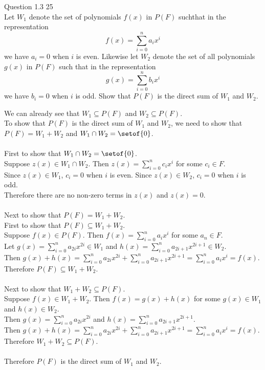 \documentclass[answers,12pt,addpoints]{exam}
\begin{document}
\begin{questions}
    \question Question 1.3 25\\
    Let $W_1$ denote the set of polynomials $f(x)$ in $P(F)$ suchthat in the representation 
    $$ f(x) = \sum_{i=0}^n a_i x^i$$
    we have $a_i = 0$ when $i$ is even. Likewise let $W_2$ denote the set of all polynomials $g(x)$ in $P(F)$ such that in the representation
    $$ g(x) = \sum_{i=0}^n b_i x^i$$
    we have $b_i = 0$ when $i$ is odd. Show that $P(F)$ is the direct sum of $W_1$ and $W_2$.
    \begin{solution}
        We can already see that $W_1 \subseteq P(F)$ and $W_2 \subseteq P(F)$.\\
        To show that $P(F)$ is the direct sum of $W_1$ and $W_2$, we need to show that $P(F) = W_1 + W_2$ and $W_1 \cap W_2 = \setof{0}$.\\\\
        First to show that $W_1 \cap W_2 = \setof{0}$.\\
        Suppose $z(x) \in W_1 \cap W_2$. Then $z(x) = \sum_{i=0}^n c_i x^i$ for some $c_i \in F$.\\
        Since $z(x) \in W_1$, $c_i = 0$ when $i$ is even. Since $z(x) \in W_2$, $c_i = 0$ when $i$ is odd.\\
        Therefore there are no non-zero terms in $z(x)$ and $z(x) = 0$.\\\\
        Next to show that $P(F) = W_1 + W_2$.\\
        First to show that $P(F) \subseteq W_1 + W_2$.\\
        Suppose $f(x) \in P(F)$. Then $f(x) = \sum_{i=0}^n a_i x^i$ for some $a_n \in F$.\\
        Let $g(x) = \sum_{i=0}^n a_{2i} x^{2i} \in W_1$ and $h(x) = \sum_{i=0}^n a_{2i+1} x^{2i+1} \in W_2$.\\
        Then $g(x) + h(x) = \sum_{i=0}^n a_{2i} x^{2i} + \sum_{i=0}^n a_{2i+1} x^{2i+1} = \sum_{i=0}^n a_i x^i = f(x)$.\\
        Therefore $P(F) \subseteq W_1 + W_2$.\\\\
        Next to show that $W_1 + W_2 \subseteq P(F)$.\\
        Suppose $f(x) \in W_1 + W_2$. Then $f(x) = g(x) + h(x)$ for some $g(x) \in W_1$ and $h(x) \in W_2$.\\
        Then $g(x) = \sum_{i=0}^n a_{2i} x^{2i}$ and $h(x) = \sum_{i=0}^n a_{2i+1} x^{2i+1}$.\\
        Then $g(x) + h(x) = \sum_{i=0}^n a_{2i} x^{2i} + \sum_{i=0}^n a_{2i+1} x^{2i+1} = \sum_{i=0}^n a_i x^i = f(x)$.\\
        Therefore $W_1 + W_2 \subseteq P(F)$.\\\\
        Therefore $P(F)$ is the direct sum of $W_1$ and $W_2$.
    \end{solution}


\end{questions}
\end{document}
